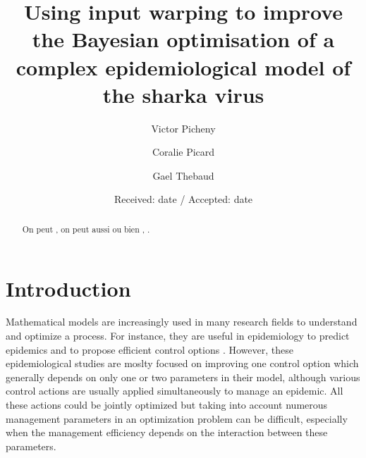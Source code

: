 	
	\title{Using input warping to improve the Bayesian optimisation of a complex epidemiological model of the sharka virus %
	}
	
	
	\author{Victor Picheny         \and
		Coralie Picard        \and
		Gael Thebaud
	}
	
	
	
	\date{Received: date / Accepted: date}
	
	\maketitle
	
	
	\begin{abstract}
		On peut  , on peut aussi  ou bien , .
	\end{abstract}
	
	\section{Introduction}
	
	Mathematical models are increasingly used in many research fields to understand and optimize a process. For instance, 
	they are useful in epidemiology to predict epidemics and to propose efficient control options 
	\cite{cunniffe2015thirteen,cunniffe2016modeling,mushayabasa2015modeling,tildesley2006optimal,bajardi2012optimizing,kompas2017optimal,vanderwaal2017optimal,grechi2012designing}.
	However, these epidemiological studies are moslty focused on improving one control option which generally depends on only one or two parameters in their model, 
	although various control actions are usually applied simultaneously to manage an epidemic. All these actions could be jointly optimized but taking into account numerous management parameters in an optimization problem can be difficult,
	especially when the management efficiency depends on the interaction between these parameters.
	
